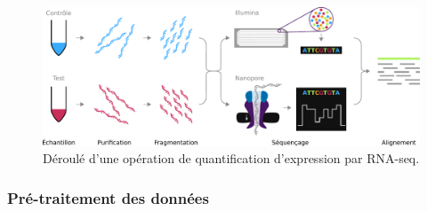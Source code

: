 \begin{figure}
    \centering
    \includegraphics[width=\textwidth]{img/intro/2_meth_transcripto/intro_2_rnaseq_workflpow.pdf}
    \caption{Déroulé d'une opération de quantification d'expression par RNA-seq.}
    \label{fig:rnaseq_workflow}
\end{figure}


\subsubsection{Pré-traitement des données}

